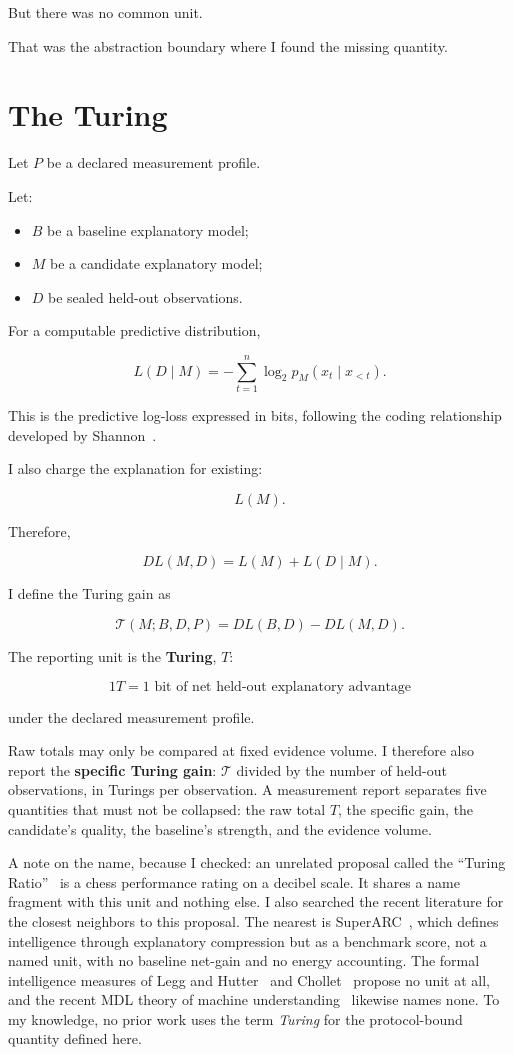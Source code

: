 \documentclass[11pt]{article}
\begin{document}
But there was no common unit.

That was the abstraction boundary where I found the missing quantity.

\section{The Turing}

Let \(P\) be a declared measurement profile.

Let:

\begin{itemize}
    \item \(B\) be a baseline explanatory model;
    \item \(M\) be a candidate explanatory model;
    \item \(D\) be sealed held-out observations.
\end{itemize}

For a computable predictive distribution,

\[
L(D\mid M)
=
-\sum_{t=1}^{n}
\log_2p_M(x_t\mid x_{<t}).
\]

This is the predictive log-loss expressed in bits, following the coding relationship developed by Shannon~\cite{shannon1948}.

I also charge the explanation for existing:

\[
L(M).
\]

Therefore,

\[
DL(M,D)
=
L(M)+L(D\mid M).
\]

I define the Turing gain as

\[
\boxed{
\mathcal{T}(M;B,D,P)
=
DL(B,D)-DL(M,D).
}
\]

The reporting unit is the \textbf{Turing}, \(T\):

\[
\boxed{
1T
=
1\text{ bit of net held-out explanatory advantage}
}
\]

under the declared measurement profile.

Raw totals may only be compared at fixed evidence volume. I therefore also report the \textbf{specific Turing gain}: \(\mathcal{T}\) divided by the number of held-out observations, in Turings per observation. A measurement report separates five quantities that must not be collapsed: the raw total \(T\), the specific gain, the candidate's quality, the baseline's strength, and the evidence volume.

A note on the name, because I checked: an unrelated proposal called the ``Turing Ratio''~\cite{masum2003} is a chess performance rating on a decibel scale. It shares a name fragment with this unit and nothing else. I also searched the recent literature for the closest neighbors to this proposal. The nearest is SuperARC~\cite{superarc2025}, which defines intelligence through explanatory compression but as a benchmark score, not a named unit, with no baseline net-gain and no energy accounting. The formal intelligence measures of Legg and Hutter~\cite{legghutter2007} and Chollet~\cite{chollet2019} propose no unit at all, and the recent MDL theory of machine understanding~\cite{zhangliu2025} likewise names none. To my knowledge, no prior work uses the term \textit{Turing} for the protocol-bound quantity defined here.
\end{document}
